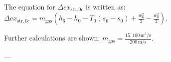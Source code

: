 The equation for \( \Delta ex_{\text{str},0c} \) is written as:  
\( \Delta ex_{\text{str},0c} = m_{\text{gas}} \left( h_6 - h_0 - T_0 (s_6 - s_0) + \frac{w_6^2}{2} - \frac{w_0^2}{2} \right) \).  

Further calculations are shown:  
\( m_{\text{gas}} = \frac{15,100 \, \text{m}^3/\text{s}}{200 \, \text{m/s}} \).  

---